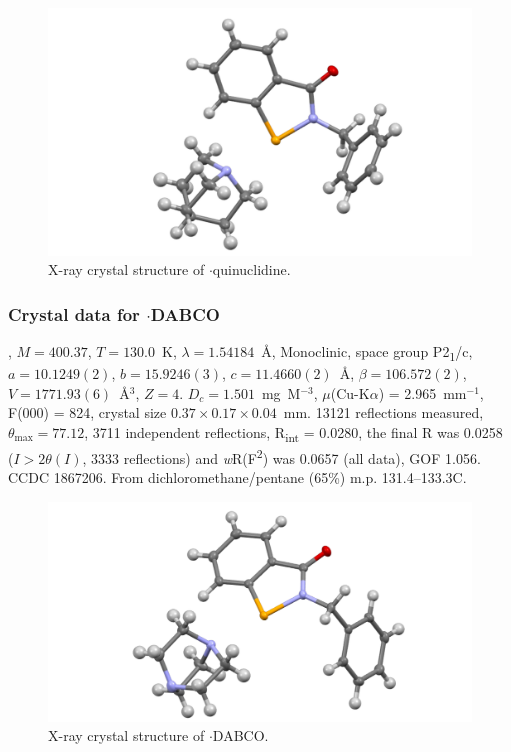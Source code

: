 \begin{refsection}
\begin{figure}
  \includegraphics[width=0.6\linewidth]{Figures/ebs-bn-quin-xtal.pdf}
  \caption{X-ray crystal structure of \texorpdfstring{$\cdot$quinuclidine}{C21H24N2OSe}.}
\end{figure}

\subsubsection{Crystal data for \texorpdfstring{$\cdot$DABCO}{C20H23N3OSe}}
, $M=400.37$, $T=130.0$~K, $\lambda=1.54184$~\AA, Monoclinic, space group P2\textsubscript{1}/c, $a = 10.1249(2)$, $b = 15.9246(3)$, $c = 11.4660(2)$~\AA, $\beta = 106.572(2)$\degree, $V = 1771.93(6)$~\AA$^{3}$, $Z = 4$.
$D_{c} = 1.501$~mg~M$^{-3}$, $\mu$(Cu-K$\alpha$) = 2.965~mm$^{-1}$, F(000) = 824, crystal size $0.37 \times 0.17 \times 0.04$~mm.
13121 reflections measured, $\theta_{\mathrm{max}} = 77.12$\degree, 3711 independent reflections, R\textsubscript{int} = 0.0280, the final R was 0.0258 ($I > 2\theta(I)$, 3333 reflections) and \emph{w}R(F\textsuperscript{2}) was 0.0657 (all data), GOF 1.056.
CCDC 1867206.
From dichloromethane/pentane (65\%) m.p. 131.4--133.3\degree C.

\begin{figure}
  \includegraphics[width=0.6\linewidth]{Figures/ebs-bn-dabco-xtal.pdf}
  \caption{X-ray crystal structure of \texorpdfstring{$\cdot$DABCO}{C20H23N3OSe}.}
\end{figure}


\end{refsection}
